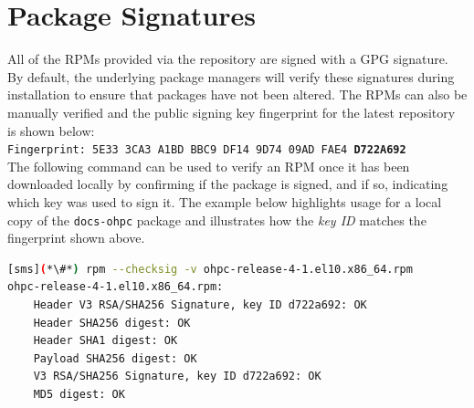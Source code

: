 \clearpage
\section{Package Signatures}

All of the RPMs provided via the \OHPC{} repository are signed with a GPG
signature. By default, the underlying package managers will verify these signatures during
installation to ensure that packages have not been altered. The RPMs can also
be manually verified and the public signing key fingerprint for the latest
repository is shown below: \\

\texttt{Fingerprint: 5E33 3CA3 A1BD BBC9 DF14 9D74 09AD FAE4 {\bf D722A692}} \\

\noindent The following command can be used to verify an RPM once it
has been downloaded locally by confirming if the package is signed, and if so,
indicating which key was used to sign it. The example below highlights usage
for a local copy of the \texttt{docs-ohpc} package and illustrates how the {\em
key ID} matches the fingerprint shown above.

\begin{lstlisting}[language=bash,keywords={}]
[sms](*\#*) rpm --checksig -v ohpc-release-4-1.el10.x86_64.rpm
ohpc-release-4-1.el10.x86_64.rpm:
    Header V3 RSA/SHA256 Signature, key ID d722a692: OK
    Header SHA256 digest: OK
    Header SHA1 digest: OK
    Payload SHA256 digest: OK
    V3 RSA/SHA256 Signature, key ID d722a692: OK
    MD5 digest: OK

\end{lstlisting}
